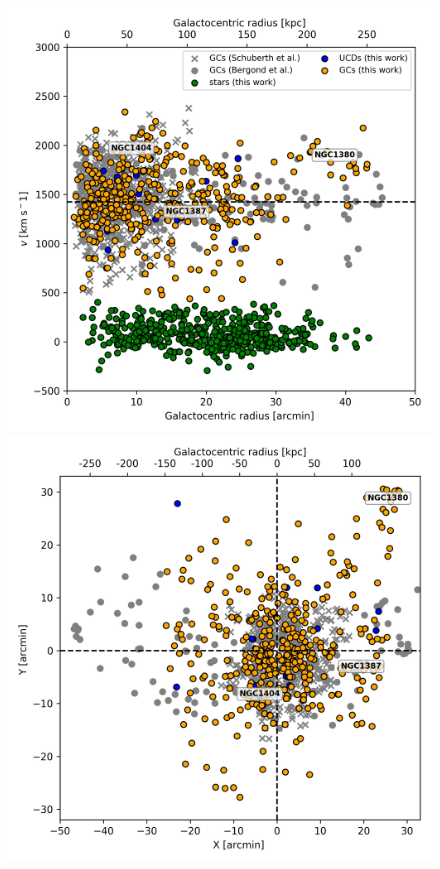 \documentclass[usenatbib]{mnras}
\begin{document}
\begin{figure}
\centering
\includegraphics[width=\columnwidth]{figures/RV.png}
\includegraphics[width=\columnwidth]{figures/XY.png}

\end{figure}
\end{document}
